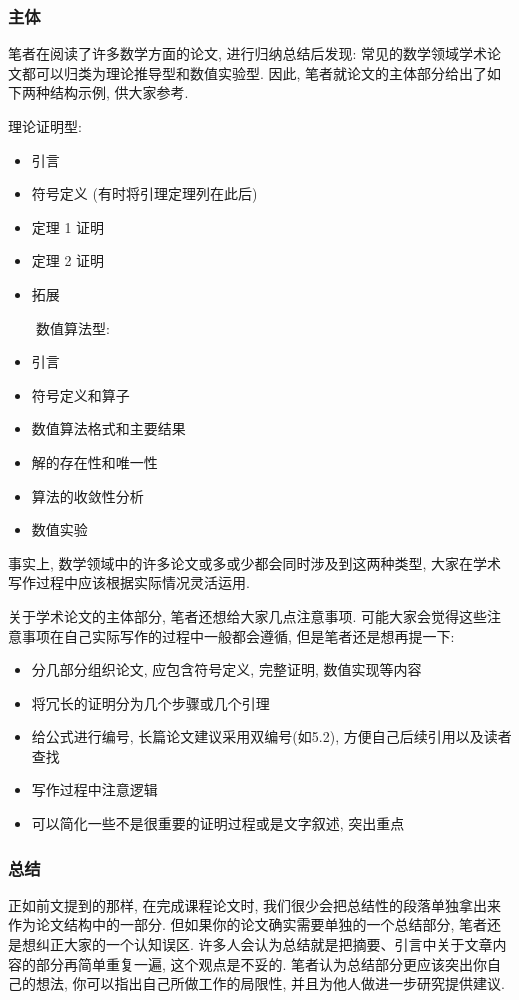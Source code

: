 \documentclass{formatBook}
\begin{document}
\subsubsection{主体}
笔者在阅读了许多数学方面的论文, 进行归纳总结后发现: 常见的数学领域学术论文都可以归类为理论推导型和数值实验型. 因此, 笔者就论文的主体部分给出了如下两种结构示例, 供大家参考. 
\begin{multicols}{2}
    理论证明型: 
    \begin{itemize}
        \item 引言
        \item 符号定义 (有时将引理定理列在此后)
        \item 定理 1 证明
        \item 定理 2 证明
        \item 拓展
    \end{itemize}
    \ \ \ \   数值算法型: 
    \begin{itemize}
        \item 引言
        \item 符号定义和算子
        \item 数值算法格式和主要结果
        \item 解的存在性和唯一性
        \item 算法的收敛性分析
        \item 数值实验
    \end{itemize}
\end{multicols}
\par 事实上, 数学领域中的许多论文或多或少都会同时涉及到这两种类型, 大家在学术写作过程中应该根据实际情况灵活运用. 
\par 关于学术论文的主体部分, 笔者还想给大家几点注意事项. 可能大家会觉得这些注意事项在自己实际写作的过程中一般都会遵循, 但是笔者还是想再提一下: 
\begin{itemize}
    \item 分几部分组织论文, 应包含符号定义, 完整证明, 数值实现等内容
    \item 将冗长的证明分为几个步骤或几个引理
    \item 给公式进行编号, 长篇论文建议采用双编号(如5.2), 方便自己后续引用以及读者查找
    \item 写作过程中注意逻辑
    \item 可以简化一些不是很重要的证明过程或是文字叙述, 突出重点
\end{itemize}
\subsubsection{总结}
正如前文提到的那样, 在完成课程论文时, 我们很少会把总结性的段落单独拿出来作为论文结构中的一部分. 但如果你的论文确实需要单独的一个总结部分, 笔者还是想纠正大家的一个认知误区. 许多人会认为总结就是把摘要、引言中关于文章内容的部分再简单重复一遍, 这个观点是不妥的. 笔者认为总结部分更应该突出你自己的想法, 你可以指出自己所做工作的局限性, 并且为他人做进一步研究提供建议. 
\end{document}
